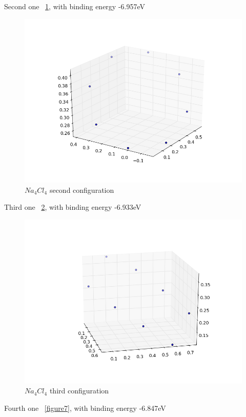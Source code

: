 \documentclass[11pt,letterpaper]{article}
\begin{document}
Second one ~\ref{figure5}, with binding energy -6.957eV

\begin{figure}
\begin{center}
\includegraphics[width=0.8\linewidth,angle=0]{na4_2.png}
\caption{$Na_4Cl_4$ second configuration}
\label{figure5}
\end{center}
\end{figure}

Third one ~\ref{figure6}, with binding energy -6.933eV

\begin{figure}
\begin{center}
\includegraphics[width=0.8\linewidth,angle=0]{na4_3.png}
\caption{$Na_4Cl_4$ third configuration}
\label{figure6}
\end{center}
\end{figure}

Fourth one ~\ref{figure7}, with binding energy -6.847eV
\end{document}
